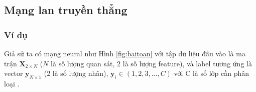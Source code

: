\subsection{Mạng lan truyền thẳng}
\label{sec:forward}
%
\subsubsection{Ví dụ}
\hspace{5mm} Giả sử ta có mạng neural như Hình \ref{fig:baitoan} với tập dữ liệu đầu vào là ma trận $\textbf{X}_{2{\times}N}$ ($N$ là số lượng quan sát, 2 là số lượng feature), và label tương ứng là vector $\textbf{y}_{N\times 1}$ (2 là số lượng nhãn), $\textbf{y}_i \in (1,2,3,\ldots,C)$ với C là số lớp cần phân loại .

